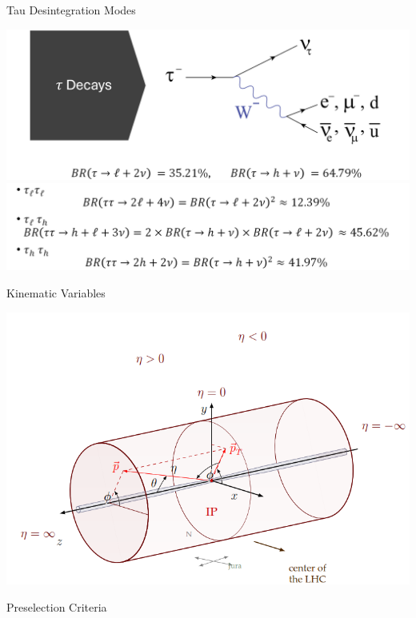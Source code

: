 \documentclass{bredelebeamer}
\begin{document}
\begin{frame}{Tau Desintegration Modes}
	\begin{center}
		\includegraphics[width=.99\linewidth]{tau_decays.png}
		$$ $$\pause
		\includegraphics[width=.99\linewidth]{tau_decays2.png}
	\end{center}
\end{frame}

\begin{frame}{Kinematic Variables}
	\begin{center}
		\includegraphics[width=.99\linewidth]{Kinematic_Variables.png}
	\end{center}
\end{frame}

\begin{frame}{Preselection Criteria}
	\begin{center}
		\large
		
	\end{center}
\end{frame}
\end{document}
